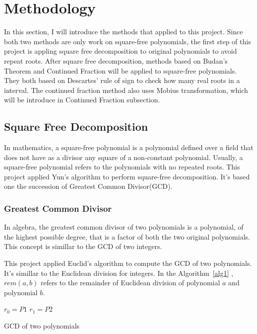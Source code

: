 \section{Methodology}

In this section, I will introduce the methods that applied to this project.
Since both two methods are only work on square-free polynomials, the first step
of this project is appling square free decomposition to original polynomials to
avoid repeat roots. After square free decomposition, methods based on Budan's
Theorem and Continued Fraction will be applied to square-free polynomials. They both based on
Descartes' rule of sign to check how many real roots in a interval. The continued fraction
method also uses Mobius transformation, which will be introduce in Continued Fraction
subsection.

\subsection{Square Free Decomposition} 
In mathematics, a square-free polynomial is a polynomial defined over a field
that does not have as a divisor any square of a non-constant
polynomial\cite{Yuns}. Usually, a square-free polynomial refers to the
polynomials with no repeated roots. This project applied Yun's
algorithm\cite{Yuns} to perform square-free decomposition. It's based one the
succession of Greatest Common Divisor(GCD).

\subsubsection{Greatest Common Divisor}

In algebra, the greatest common divisor of two polynomials is a polynomial, 
of the highest possible degree, that is a factor of both the two original
polynomials. This concept is simillar to the GCD of two integers. 

This project applied Euclid's algorithm to compute the GCD of two polynomials.
It's simillar to the  Euclidean division for integers. In the Algorithm~\ref{alg1}
, $rem(a,b)$ refers to the remainder of Euclidean division of
polynomial $a$ and polynomial $b$.

\begin{algorithm}[H]
\label{alg1}
\SetAlgoLined


  $r_0 = P1$\;
  $r_1 = P2$\;


\caption{GCD of two polynomials}
\end{algorithm}

